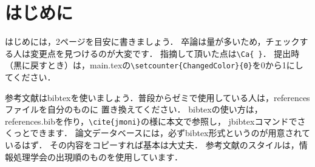 ﻿\section{はじめに}\label{sec:intro}
はじめには，2ページを目安に書きましょう．
卒論は量が多いため，チェックする人は変更点を見つけるのが大変です．
指摘して頂いた点は\verb|\Ca{ }|．
提出時（黒に戻すとき）は，main.texの\verb|\setcounter{ChangedColor}{0}|を0から1にしてください．

参考文献はbibtexを使いましょう．普段からゼミで使用している人は，referencesファイルを自分のものに
置き換えてください．
bibtexの使い方は，references.bibを作り，\verb|\cite{jmoni}|の様に本文で参照\cite{jmoni}し，
jbibtexコマンドでさくっとできます．
論文データベースには，必ずbibtex形式というのが用意されているはず．
その内容をコピーすれば基本は大丈夫．
参考文献のスタイルは，情報処理学会の出現順のものを使用しています．
